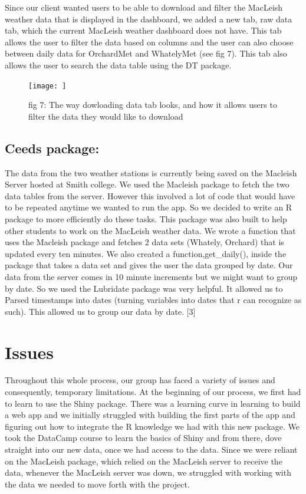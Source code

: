 \documentclass[10pt,letterpaper]{article}
\begin{document}
Since our client wanted users to be able to download and filter the
MacLeish weather data that is displayed in the dashboard, we added a new
tab, raw data tab, which the current MacLeish weather dashboard does not
have. This tab allows the user to filter the data based on columns and
the user can also choose between daily data for OrchardMet and
WhatelyMet (see fig 7). This tab also allows the user to search the data
table using the DT package.

\begin{figure}
\texttt{[image: ]} \caption{fig 7: The way dowloading data tab looks, and how it allows users to filter the data they would like to download}\label{fig:unnamed-chunk-7}
\end{figure}

\subsection{Ceeds package:}\label{ceeds-package}

The data from the two weather stations is currently being saved on the
Macleish Server hosted at Smith college. We used the Macleish package to
fetch the two data tables from the server. However this involved a lot
of code that would have to be repeated anytime we wanted to run the app.
So we decided to write an R package to more efficiently do these tasks.
This package was also built to help other students to work on the
MacLeish weather data. We wrote a function that uses the Macleish
package and fetches 2 data sets (Whately, Orchard) that is updated every
ten minutes. We also created a function,get\_daily(), inside the package
that takes a data set and gives the user the data grouped by date. Our
data from the server comes in 10 minute increments but we might want to
group by date. So we used the Lubridate package was very helpful. It
allowed us to Parsed timestamps into dates (turning variables into dates
that r can recognize as such). This allowed us to group our data by
date. {[}3{]}

\section{Issues}\label{issues}

Throughout this whole process, our group has faced a variety of issues
and consequently, temporary limitations. At the beginning of our
process, we first had to learn to use the Shiny package. There was a
learning curve in learning to build a web app and we initially struggled
with building the first parts of the app and figuring out how to
integrate the R knowledge we had with this new package. We took the
DataCamp course to learn the basics of Shiny and from there, dove
straight into our new data, once we had access to the data. Since we
were reliant on the MacLeish package, which relied on the MacLeish
server to receive the data, whenever the MacLeish server was down, we
struggled with working with the data we needed to move forth with the
project.
\end{document}
